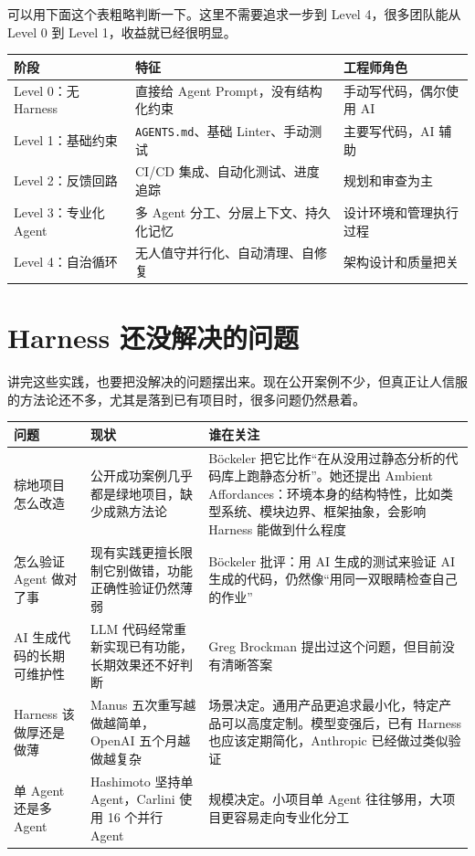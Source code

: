 \documentclass[9pt,a4paper,twocolumn]{ctexart}
\begin{document}
可以用下面这个表粗略判断一下。这里不需要追求一步到 Level 4，很多团队能从 Level 0 到 Level 1，收益就已经很明显。


{\footnotesize
\begin{tabular}{|p{}|p{}|p{}|}
\hline
\textbf{阶段} & \textbf{特征} & \textbf{工程师角色} \\
\hline
Level 0：无 Harness & 直接给 Agent Prompt，没有结构化约束 & 手动写代码，偶尔使用 AI \\
\hline
Level 1：基础约束 & \texttt{AGENTS.md}、基础 Linter、手动测试 & 主要写代码，AI 辅助 \\
\hline
Level 2：反馈回路 & CI/CD 集成、自动化测试、进度追踪 & 规划和审查为主 \\
\hline
Level 3：专业化 Agent & 多 Agent 分工、分层上下文、持久化记忆 & 设计环境和管理执行过程 \\
\hline
Level 4：自治循环 & 无人值守并行化、自动清理、自修复 & 架构设计和质量把关 \\
\hline
\end{tabular}
}



\section*{Harness 还没解决的问题}


讲完这些实践，也要把没解决的问题摆出来。现在公开案例不少，但真正让人信服的方法论还不多，尤其是落到已有项目时，很多问题仍然悬着。


{\footnotesize
\begin{tabular}{|p{}|p{}|p{}|}
\hline
\textbf{问题} & \textbf{现状} & \textbf{谁在关注} \\
\hline
棕地项目怎么改造 & 公开成功案例几乎都是绿地项目，缺少成熟方法论 & Böckeler 把它比作“在从没用过静态分析的代码库上跑静态分析”。她还提出 Ambient Affordances：环境本身的结构特性，比如类型系统、模块边界、框架抽象，会影响 Harness 能做到什么程度 \\
\hline
怎么验证 Agent 做对了事 & 现有实践更擅长限制它别做错，功能正确性验证仍然薄弱 & Böckeler 批评：用 AI 生成的测试来验证 AI 生成的代码，仍然像“用同一双眼睛检查自己的作业” \\
\hline
AI 生成代码的长期可维护性 & LLM 代码经常重新实现已有功能，长期效果还不好判断 & Greg Brockman 提出过这个问题，但目前没有清晰答案 \\
\hline
Harness 该做厚还是做薄 & Manus 五次重写越做越简单，OpenAI 五个月越做越复杂 & 场景决定。通用产品更追求最小化，特定产品可以高度定制。模型变强后，已有 Harness 也应该定期简化，Anthropic 已经做过类似验证 \\
\hline
单 Agent 还是多 Agent & Hashimoto 坚持单 Agent，Carlini 使用 16 个并行 Agent & 规模决定。小项目单 Agent 往往够用，大项目更容易走向专业化分工 \\
\hline
\end{tabular}
}
\end{document}
